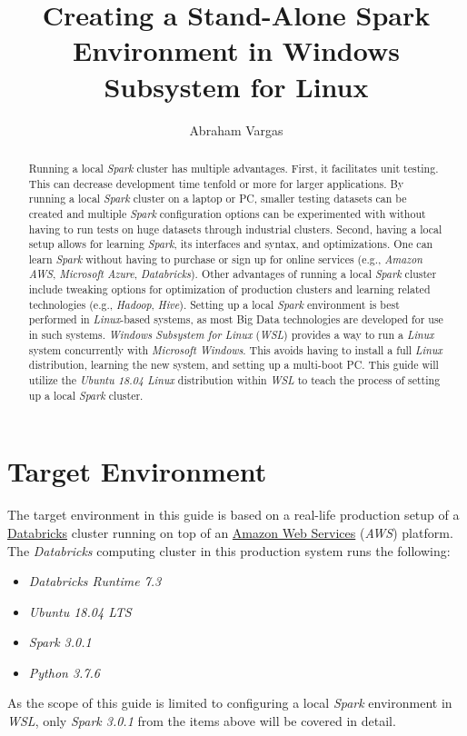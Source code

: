 \documentclass{article}
\begin{document}
\title{Creating a Stand-Alone Spark Environment in Windows Subsystem for Linux}
\author{Abraham Vargas}
\date{}
\maketitle

\begin{abstract}
Running a local \emph{Spark} cluster has multiple advantages. First, it facilitates unit testing.
This can decrease development time tenfold or more for larger applications. By running a
local \emph{Spark} cluster on a laptop or PC, smaller testing datasets can be created and multiple
\emph{Spark} configuration options can be experimented with without having to run tests on huge
datasets through industrial clusters. Second, having a local setup allows for learning
\emph{Spark}, its interfaces and syntax, and optimizations. One can learn \emph{Spark} without
having to purchase or sign up for online services (e.g., \emph{Amazon AWS}, \emph{Microsoft Azure},
\emph{Databricks}). Other advantages of running a local \emph{Spark} cluster include tweaking
options for optimization of production clusters and learning related technologies (e.g.,
\emph{Hadoop}, \emph{Hive}). Setting up a local \emph{Spark} environment is best performed in
\emph{Linux}-based systems, as most Big Data technologies are developed for use in such systems.
\emph{Windows Subsystem for Linux} (\emph{WSL}) provides a way to run a \emph{Linux} system
concurrently with \emph{Microsoft Windows}. This avoids having to install a full \emph{Linux}
distribution, learning the new system, and setting up a multi-boot PC. This guide will utilize
the \emph{Ubuntu 18.04 Linux} distribution within \emph{WSL} to teach the process of setting up a
local \emph{Spark} cluster.
\end{abstract}

\newpage
\tableofcontents
\newpage

\section{Target Environment}
The target environment in this guide is based on a real-life production setup of a
\href{https://databricks.com/}{Databricks} cluster running on top of an
\href{https://aws.amazon.com/}{Amazon Web Services} (\emph{AWS}) platform.
The \emph{Databricks} computing cluster in this production system runs the following:
\begin{itemize}
  \item \emph{Databricks Runtime 7.3}
  \item \emph{Ubuntu 18.04 LTS}
  \item \emph{Spark 3.0.1}
  \item \emph{Python 3.7.6}
\end{itemize}
As the scope of this guide is limited to configuring a local \emph{Spark} environment in
\emph{WSL}, only \emph{Spark 3.0.1} from the items above will be covered in detail.
\end{document}
